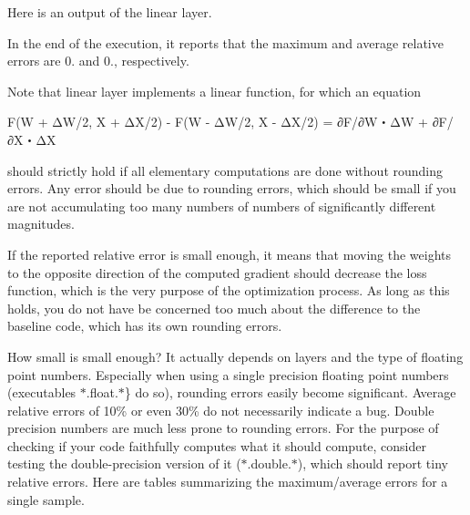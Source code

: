 Here is an output of the linear layer.




In the end of the execution, it reports that the maximum and average relative errors are 0. and 0., respectively.

Note that linear layer implements a linear function, for which an equation \begin{DoxyVerb}F(W + ΔW/2, X + ΔX/2) - F(W - ΔW/2, X - ΔX/2) = ∂F/∂W・ΔW + ∂F/∂X・ΔX
\end{DoxyVerb}


should strictly hold if all elementary computations are done without rounding errors. Any error should be due to rounding errors, which should be small if you are not accumulating too many numbers of numbers of significantly different magnitudes.

If the reported relative error is small enough, it means that moving the weights to the opposite direction of the computed gradient should decrease the loss function, which is the very purpose of the optimization process. As long as this holds, you do not have be concerned too much about the difference to the baseline code, which has its own rounding errors.

How small is small enough? It actually depends on layers and the type of floating point numbers. Especially when using a single precision floating point numbers (executables $\ast$.float.$\ast$\} do so), rounding errors easily become significant. Average relative errors of 10\% or even 30\% do not necessarily indicate a bug. Double precision numbers are much less prone to rounding errors. For the purpose of checking if your code faithfully computes what it should compute, consider testing the double-\/precision version of it ($\ast$.double.$\ast$), which should report tiny relative errors. Here are tables summarizing the maximum/average errors for a single sample.

